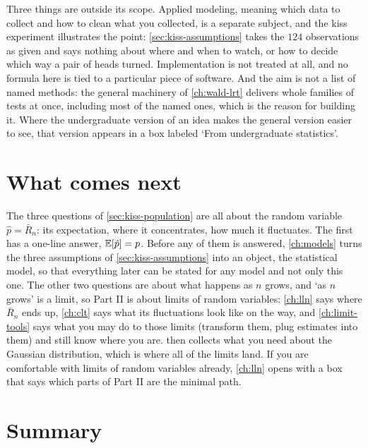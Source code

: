 Three things are outside its scope.
Applied modeling, meaning which data to collect and how to clean what you collected, is a separate subject, and the kiss experiment illustrates the point: \cref{sec:kiss-assumptions} takes the $124$ observations as given and says nothing about where and when to watch, or how to decide which way a pair of heads turned.
Implementation is not treated at all, and no formula here is tied to a particular piece of software.
And the aim is not a list of named methods: the general machinery of \cref{ch:wald-lrt} delivers whole families of tests at once, including most of the named ones, which is the reason for building it.
Where the undergraduate version of an idea makes the general version easier to see, that version appears in a box labeled `From undergraduate statistics'.

\section{What comes next}
\label{sec:kiss-next}

The three questions of \cref{sec:kiss-population} are all about the random variable $\hat{p} = \bar{R}_n$: its expectation, where it concentrates, how much it fluctuates.
The first has a one-line answer, $\operatorname*{\mathbb{E}}[\hat{p}] = p$.
Before any of them is answered, \cref{ch:models} turns the three assumptions of \cref{sec:kiss-assumptions} into an object, the statistical model, so that everything later can be stated for any model and not only this one.
The other two questions are about what happens as $n$ grows, and `as $n$ grows' is a limit, so Part II is about limits of random variables: \cref{ch:lln} says where $\bar{R}_n$ ends up, \cref{ch:clt} says what its fluctuations look like on the way, and \cref{ch:limit-tools} says what you may do to those limits (transform them, plug estimates into them) and still know where you are.
 then collects what you need about the Gaussian distribution, which is where all of the limits land.
If you are comfortable with limits of random variables already, \cref{ch:lln} opens with a box that says which parts of Part II are the minimal path.

\section{Summary}
\label{sec:kiss-summary}

